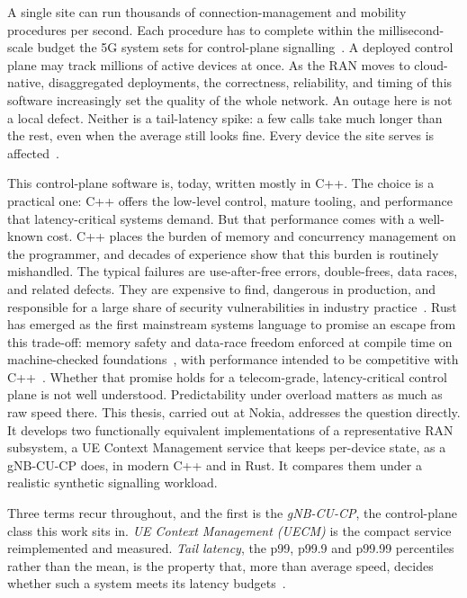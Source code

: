 \documentclass[english,oneside,a4paper,censored,csm,software-track-2020]{HYthesisML}
\begin{document}
A single site can run thousands of connection-management and
mobility procedures per second. Each procedure has to complete within the millisecond-scale
budget the 5G system sets for control-plane signalling~\cite{3gpp38913}. A deployed control plane may track millions of active
devices at once. As the RAN moves to cloud-native, disaggregated deployments, the
correctness, reliability, and timing of this software increasingly set the quality of the
whole network. An outage here is not a local defect. Neither is a tail-latency
spike: a few calls take much longer than the rest, even when the average still
looks fine. Every device the site serves is
affected~\cite{dean2013tail,barroso2017microseconds}.


This control-plane software is, today, written mostly in C++. The choice is a
practical one: C++ offers the low-level control, mature tooling, and performance that
latency-critical systems demand. But that performance comes with a well-known cost. C++
places the burden of memory and concurrency management on the programmer, and decades of
experience show that this burden is routinely mishandled. The typical failures are
use-after-free errors, double-frees, data races, and related defects. They are expensive
to find, dangerous in production, and responsible for a large share of security
vulnerabilities in industry practice~\cite{msrc2019memory,google2022android}. Rust has
emerged as the first mainstream systems language to promise an escape from this
trade-off: memory safety and data-race freedom enforced at compile time on
machine-checked foundations~\cite{klabnik2023rust,jung2018rustbelt}, with performance
intended to be competitive with C++~\cite{balasubramanian2017rust}. Whether that promise
holds for a telecom-grade, latency-critical control plane is not well understood.
Predictability under overload matters as much as raw speed there. This thesis, carried
out at Nokia, addresses the question directly. It develops two functionally equivalent
implementations of a representative RAN subsystem, a UE Context Management service that
keeps per-device state, as a gNB-CU-CP does, in modern C++ and in Rust. It compares them
under a realistic synthetic signalling workload.


Three terms recur throughout, and the first is the \emph{gNB-CU-CP}, the control-plane class this work sits in.
\emph{UE Context Management (UECM)} is the compact service reimplemented and measured.
\emph{Tail latency}, the p99, p99.9 and p99.99 percentiles rather than the mean, is the property that,
more than average speed, decides whether such a system meets its
latency budgets~\cite{dean2013tail,barroso2017microseconds}. 
\end{document}
